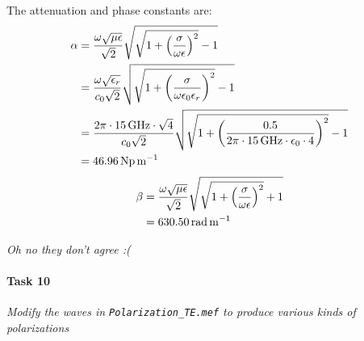 The attenuation and phase constants are:
\begin{align*}
	\alpha &= { \omega \sqrt{\mu \epsilon} \over \sqrt{2} } \sqrt{\sqrt{1 + \left( {\sigma \over \omega \epsilon} \right)^2} - 1} \\
	&= { \omega \sqrt{\epsilon_r} \over c_0 \sqrt{2} } \sqrt{\sqrt{1 + \left( {\sigma \over \omega \epsilon_0 \epsilon_r} \right)^2} - 1} \\
	&= { 2 \pi \cdot \SI{15}{\giga\hertz} \cdot \sqrt{4} \over c_0 \sqrt{2} } \sqrt{\sqrt{1 + \left( {0.5 \over 2 \pi \cdot \SI{15}{\giga\hertz} \cdot \epsilon_0 \cdot 4} \right)^2} - 1} \\
	&= \SI{46.96}{\neper\per\meter}
\end{align*}
\begin{align*}
	\beta &= { \omega \sqrt{\mu \epsilon} \over \sqrt{2} } \sqrt{\sqrt{1 + \left( {\sigma \over \omega \epsilon} \right)^2} + 1} \\
	&= \SI{630.50}{\radian\per\meter}
\end{align*}

\textit{Oh no they don't agree :(}

\paragraph{Task 10} \textit{Modify the waves in \texttt{Polarization\_TE.mef} to produce various kinds of polarizations}

